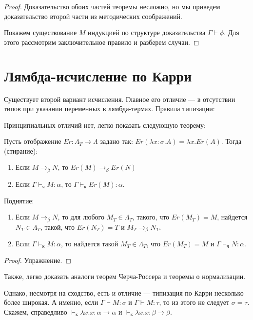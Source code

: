 \begin{proof}
Доказательство обоих частей теоремы несложно, но мы приведем доказательство второй части
из методических соображений.

Покажем существование $M$ индукцией по структуре доказательства $\Gamma\vdash\phi$.
Для этого рассмотрим заключительное правило и разберем случаи.

\end{proof}

\section{Лямбда-исчисление по Карри}

Существует второй вариант исчисления.
Главное его отличие --- в отсутствии типов при указании переменных в лямбда-термах.
Правила типизации:
 

Принципиальных отличий нет, легко показать следующую теорему:
\begin{theorem}
Пусть отображение $Er: \Lambda_T \rightarrow \Lambda$ задано так:
$Er(\lambda x:\sigma.A) = \lambda x.Er(A)$. Тогда (стирание):

\begin{enumerate}
\item Если $M\rightarrow_\beta N$, то $Er(M)\rightarrow_\beta Er(N)$
\item Если $\Gamma\vdash_\texttt{ч} M:\alpha$, то $\Gamma\vdash_\texttt{к} Er(M):\alpha$.
\end{enumerate}

Поднятие:
\begin{enumerate}
\item Если $M\rightarrow_\beta N$, то для любого $M_T \in \Lambda_T$, такого, что $Er(M_T) = M$,
найдется $N_T \in \Lambda_T$, такой, что $Er(N_T) = T$ и $M_T \rightarrow_\beta N_T$.
\item Если $\Gamma\vdash_\texttt{к} M:\alpha$, то найдется такой $M_T\in\Lambda_T$, 
что $Er(M_T)=M$ и $\Gamma\vdash_\texttt{ч} N:\alpha$.
\end{enumerate}
\end{theorem}

\begin{proof}
Упражнение.
\end{proof}

Также, легко доказать аналоги теорем Черча-Россера и теоремы о нормализации.

Однако, несмотря на сходство, есть и отличие --- типизация по Карри несколько более
широкая. А именно, если $\Gamma\vdash M:\sigma$ и $\Gamma\vdash M:\tau$, 
то из этого не следует $\sigma=\tau$. Скажем, справедливо
$\vdash_\texttt{к}\lambda x.x : \alpha\rightarrow\alpha$ и 
$\vdash_\texttt{к}\lambda x.x : \beta\rightarrow\beta$.


